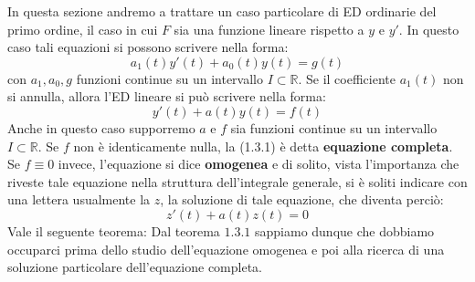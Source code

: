 \documentclass[a4paper]{article}
\numberwithin{equation}{subsection}
\begin{document}
In questa sezione andremo a trattare un caso particolare di ED ordinarie del primo ordine,
il caso in cui $F$ sia una funzione lineare rispetto a $y$ e $y'$.
In questo caso tali equazioni si possono scrivere nella forma:
\begin{equation*}
    a_1(t)y'(t) + a_0(t)y(t) = g(t)
\end{equation*}
con $a_1, a_0, g$ funzioni continue su un intervallo $I \subset \mathbb{R}$.
Se il coefficiente $a_1(t)$ non si annulla, allora l'ED lineare si può scrivere nella forma:
\begin{equation}
    y'(t) + a(t)y(t) = f(t)
\end{equation}
Anche in questo caso supporremo $a$ e $f$ sia funzioni continue su un intervallo $I \subset \mathbb{R}$.
Se $f$ non è identicamente nulla, la (1.3.1) è detta \textbf{equazione completa}. Se $f \equiv 0$ invece, 
l'equazione si dice \textbf{omogenea} e di solito, vista l'importanza che riveste tale equazione nella
struttura dell'integrale generale, si è soliti indicare con una lettera usualmente la $z$, la soluzione di tale equazione, che diventa perciò:
\begin{equation}
    z'(t) + a(t)z(t) = 0
\end{equation}
Vale il seguente teorema:
\noindent
Dal teorema $1.3.1$ sappiamo dunque che dobbiamo occuparci prima dello studio dell'equazione omogenea e poi alla ricerca di una soluzione particolare
dell'equazione completa.
\\
\end{document}
